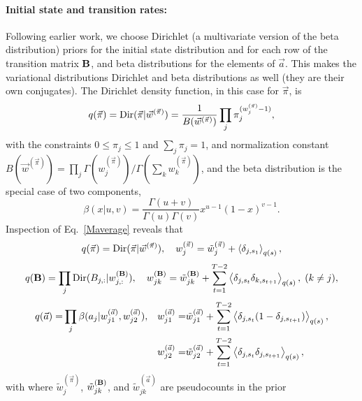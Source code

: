 \paragraph{Initial state and transition rates:}
Following earlier
work\cite{Mackay1997,Beal2003,Bronson2009,Okamoto2012,Persson2013}, we
choose Dirichlet (a multivariate version of the beta
distribution\cite{wiki:dirichlet}) priors for the initial state
distribution and for each row of the transition matrix $\mathbf{B}$,
and beta distributions for the elements of $\vec a$. This makes the
variational distributions Dirichlet and beta distributions as well
(they are their own conjugates). The Dirichlet density function, in
this case for $\vec\pi$, is
\begin{equation}\label{eq:p0pi}
        q(\vec\pi)=\text{Dir}(\vec\pi|\vec{w}^{(\vec{\pi})})=\frac{1}{B(\vec
        w^{(\vec\pi)})}\prod_j \pi_j^{(w_j^{(\vec\pi)}-1)},
\end{equation}
with the constraints $0\le \pi_j\le1$ and $\sum_j\pi_j=1$, and
normalization constant $B(\vec
w^{(\vec\pi)})=\prod_j\Gamma(w_j^{(\vec\pi)})/\Gamma(\sum_kw_k^{(\vec\pi)})$\cite{wiki:dirichlet},
and the beta distribution is the special case of two components,
\begin{equation}
\beta(x|u,v)=\frac{\Gamma(u+v)}{\Gamma(u)\Gamma(v)}x^{u-1}(1-x)^{v-1}.
\end{equation}
Inspection of Eq.~\eqref{Maverage} reveals that
\begin{equation}\label{VBM_pi}
  q(\vec{\pi})=\text{Dir}(\vec{\pi}|\vec{w}^{(\vec{\pi})}),\quad
w_j^{(\vec{\pi})}=\tilde
w_j^{(\vec{\pi})}+\left\langle \delta_{j,s_1}\right\rangle_{q(s)},
\end{equation}
\begin{equation}\label{VBM_B}
  q(\mathbf{B})=\prod_j
  \text{Dir}(B_{j,:}|w_{j,:}^{(\mathbf{B})}),\quad
w_{jk}^{(\mathbf{B})}=\tilde w_{jk}^{(\mathbf{B})}
  +\sum_{t=1}^{T-2}\left\langle \delta_{j,s_t}\delta_{k,s_{t+1}}\right\rangle_{q(s)},\; (k\ne j),
\end{equation}
\begin{align}
  q(\vec{a})=&\prod_j \beta(a_j|w_{j1}^{(\vec{a})},w_{j2}^{(\vec{a})}),&
  w_{j1}^{(\vec{a})}=&\tilde w_{j1}^{(\vec{a})}
  +\sum_{t=1}^{T-2}\left\langle \delta_{j,s_t}(1-\delta_{j,s_{t+1}})\right\rangle_{q(s)},\nonumber\\
  &&  
w_{j2}^{(\vec{a})}=&\tilde w_{j2}^{(\vec{a})}
  +\sum_{t=1}^{T-2}\left\langle \delta_{j,s_t}\delta_{j,s_{t+1}}\right\rangle_{q(s)},
\label{VBM_a}
\end{align}
with where $\tilde w_j^{(\vec{\pi})}$, $\tilde w_{jk}^{(\mathbf{B})}$,
and $\tilde w_{jk}^{(\vec{a})}$ are pseudocounts in the prior
